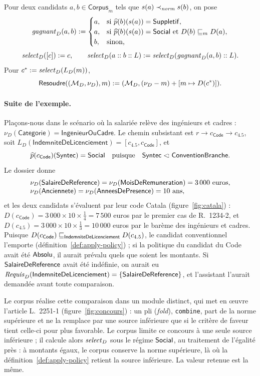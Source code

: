 \documentclass[review]{jflart}
\newcommand{\Categorie}{\ensuremath{\mathsf{Categorie}}}
\newcommand{\Cadre}{\ensuremath{\mathsf{IngenieurOuCadre}}}
\newcommand{\Presence}{\ensuremath{\mathsf{AnneesDePresence}}}
\newcommand{\MoisRem}{\ensuremath{\mathsf{MoisDeRemuneration}}}
\renewcommand{\Indem}{\ensuremath{\mathsf{IndemniteDeLicenciement}}}
\renewcommand{\Cand}{\ensuremath{\mathsf{Corpus}}}
\begin{document}
\begin{defi}\label{def:apply-policy}
Pour deux candidats \(a,b\in\Cand_m\) tels que \(s(a)\prec_{\mathit{norm}} s(b)\), on pose
\[
\mathit{gagnant}_D(a,b):=
\begin{cases}
 a,& \text{si } \widehat p(b)(s(a))=\mathsf{Suppletif},\\
 a,& \text{si } \widehat p(b)(s(a))=\mathsf{Social} \text{ et } D(b)\mathrel{\sqsubseteq_{m}}D(a),\\
 b,& \text{sinon,}
\end{cases}
\]
\[
 \mathit{select}_D([c]):=c,\qquad
 \mathit{select}_D(a::b::L):=\mathit{select}_D(\mathit{gagnant}_D(a,b)::L).
\]
Pour \(c^*:=\mathit{select}_D(L_D(m))\),
\begin{equation}
 \mathsf{Resoudre}((\mathcal{M}_D,\nu_D),m):=(\mathcal{M}_D,(\nu_D-m)+[m\mapsto D(c^*)]).
 \label{eq:resolve}
\end{equation}
\end{defi}

\paragraph{Suite de l'exemple.}
Plaçons-nous dans le scénario où la salariée relève des ingénieurs et cadres :
\(\nu_D(\Categorie)=\Cadre\). Le chemin subsistant est
\(r\to c_{\mathsf{Code}}\to c_{4.5}\), soit
\(L_D(\Indem)=[c_{4.5},c_{\mathsf{Code}}]\), et
\[
\widehat p(c_{\mathsf{Code}})(\mathsf{Syntec})=\mathsf{Social}
\quad\text{puisque}\quad \mathsf{Syntec}\mathrel{<\!:}\mathsf{ConventionBranche}.
\]
Le dossier donne
\[
\begin{array}{l}
\nu_D(\Salary)=\nu_D(\MoisRem)=3\,000\ \text{euros},\\
\nu_D(\Senior)=\nu_D(\Presence)=10\ \text{ans},
\end{array}
\]
et les deux candidats s'évaluent par leur code Catala
(figure~\ref{fig:catala}) : \(D(c_{\mathsf{Code}})=3\,000\times10\times\frac14
=7\,500\) euros par le premier cas de R.~1234-2, et
\(D(c_{4.5})=3\,000\times10\times\frac13=10\,000\) euros par le barème des
ingénieurs et cadres. Puisque \(D(c_{\mathsf{Code}})\fav{\Indem}D(c_{4.5})\),
le candidat conventionnel l'emporte (définition~\ref{def:apply-policy}) ; si la
politique du candidat du Code avait été \(\mathsf{Absolu}\), il aurait prévalu quels
que soient les montants. Si \(\mathsf{SalaireDeReference}\) avait été indéfinie, on aurait eu
\(\NeedFacts_D(\Indem)=\{\Salary\}\), et l'assistant l'aurait demandée avant
toute comparaison.

Le corpus réalise cette comparaison dans un module distinct, qui met en œuvre
l'article L.~2251-1 (figure~\ref{fig:concours}) : un pli (\emph{fold}),
\texttt{combine},
part de la norme supérieure et ne la remplace par une source inférieure que si
le critère de faveur tient celle-ci pour plus favorable. Le corpus limite ce
concours à une seule source inférieure ; il calcule alors
\(\mathit{select}_D\) sous le régime \(\mathsf{Social}\), au traitement de l'égalité
près : à montants égaux, le corpus conserve la norme supérieure, là où la
définition~\ref{def:apply-policy} retient la source inférieure. La valeur
retenue est la même.
\end{document}
